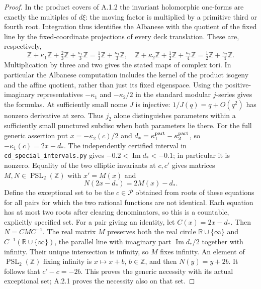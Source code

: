 \begin{proof}
In the product covers of A.1.2 the invariant holomorphic one-forms are exactly the multiples of $d\xi$: the moving factor is multiplied by a primitive third or fourth root. Integration thus identifies the Albanese with the quotient of the fixed line by the fixed-coordinate projections of every deck translation. These are, respectively,
\[
 \mathbb Z+\kappa_1\mathbb Z+\tfrac23\mathbb Z+\tfrac{\kappa_1}3\mathbb Z
   =\tfrac13\mathbb Z+\tfrac{\kappa_1}3\mathbb Z,
\quad
 \mathbb Z+\kappa_2\mathbb Z+\tfrac12\mathbb Z+\tfrac{\kappa_2}4\mathbb Z
   =\tfrac12\mathbb Z+\tfrac{\kappa_2}4\mathbb Z.
\]
Multiplication by three and two gives the stated maps of complex tori. In particular the Albanese computation includes the kernel of the product isogeny and the affine quotient, rather than just its fixed eigenspace. Using the positive-imaginary representatives $-\kappa_1$ and $-\kappa_2/2$ in the standard modular $j$-series gives the formulas. At sufficiently small nome $J$ is injective: $1/J(q)=q+O(q^2)$ has nonzero derivative at zero. Thus $j_2$ alone distinguishes parameters within a sufficiently small punctured subdisc when both parameters lie there. For the full generic assertion put $x=-\kappa_2(c)/2$ and $d_*=\kappa_1^{\rm part}-\kappa_2^{\rm part}$, so $-\kappa_1(c)=2x-d_*$. The independently certified interval in \texttt{cd\_special\_intervals.py} gives $-0.2<\operatorname{Im}d_*<-0.1$; in particular it is nonzero. Equality of the two elliptic invariants at $c,c'$ gives matrices $M,N\in\operatorname{PSL}_2(\mathbb Z)$ with $x'=M(x)$ and
\[
 N(2x-d_*)=2M(x)-d_*.
\]
Define the exceptional set to be the $c\in\mathcal P$ obtained from roots of these equations for all pairs for which the two rational functions are not identical. Each equation has at most two roots after clearing denominators, so this is a countable, explicitly specified set. For a pair giving an identity, let $C(x)=2x-d_*$. Then $N=CMC^{-1}$. The real matrix $M$ preserves both the real circle $\mathbb R\cup\{\infty\}$ and $C^{-1}(\mathbb R\cup\{\infty\})$, the parallel line with imaginary part $\operatorname{Im}d_*/2$ together with infinity. Their unique intersection is infinity, so $M$ fixes infinity. An element of $\operatorname{PSL}_2(\mathbb Z)$ fixing infinity is $x\mapsto x+b$, $b\in\mathbb Z$, and then $N(y)=y+2b$. It follows that $c'-c=-2b$. This proves the generic necessity with its actual exceptional set; A.2.1 proves the necessity also on that set.
\end{proof}

